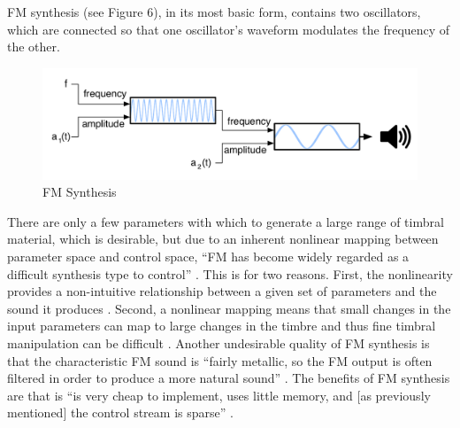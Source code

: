 \documentclass[12pt]{report} 	%
\numberwithin{figure}{chapter}
\numberwithin{table}{chapter}
\numberwithin{equation}{chapter}
\begin{document}
\begin{flushleft}
FM synthesis (see Figure 6), in its most basic form, contains two oscillators, which are connected so that one oscillator's waveform modulates the frequency of the other. 
\begin{figure}[h!]
\vspace{24pt}
\begin{center}
\includegraphics[scale=0.65]{FMSynthesis}
\caption[FM synthesis]{FM Synthesis}
\end{center}
\vspace{6pt}
\end{figure}
There are only a few parameters with which to generate a large range of timbral material, which is desirable, but due to an inherent nonlinear mapping between parameter space and control space, ``FM has become widely regarded as a difficult synthesis type to control'' \cite{Mitchell:2007fe}. This is for two reasons. First, the nonlinearity provides a non-intuitive relationship between a given set of parameters and the sound it produces \cite[p. 45]{Nicol:2005rp}. Second, a  nonlinear mapping means that small changes in the input parameters can map to large changes in the timbre and thus fine timbral manipulation can be difficult \cite[p. 2]{Jaffe:1995fv}. Another undesirable quality of FM synthesis is that the characteristic FM sound is ``fairly metallic, so the FM output is often filtered in order to produce a more natural sound'' \cite[p. 45]{Nicol:2005rp}. The benefits of FM synthesis are that is ``is very cheap to implement, uses little memory, and [as previously mentioned] the control stream is sparse'' \cite[p. 92]{Tolonen:1998bh}.


\end{flushleft}
\end{document}
